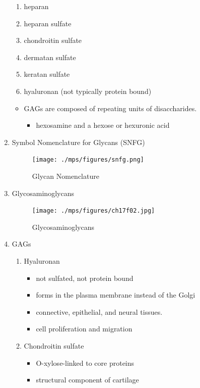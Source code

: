 \documentclass{scrartcl}
\begin{document}
\begin{enumerate}
\begin{enumerate}
\item heparan
\item heparan sulfate
\item chondroitin sulfate
\item dermatan sulfate
\item keratan sulfate
\item hyaluronan (not typically protein bound)
\end{enumerate}


\begin{itemize}
\item GAGs are composed of repeating units of disaccharides.
\begin{itemize}
\item hexosamine and a hexose or hexuronic acid
\end{itemize}
\end{itemize}

\item Symbol Nomenclature for Glycans (SNFG)
\label{sec:org1bddb03}

\begin{figure}[htbp]
\centering
\texttt{[image: ./mps/figures/snfg.png]}
\caption[Glycan Nomenclature]{\label{fig:orgaf4612b}
Glycan Nomenclature}
\end{figure}


\item Glycosaminoglycans
\label{sec:org3103504}

\begin{figure}[htbp]
\centering
\texttt{[image: ./mps/figures/ch17f02.jpg]}
\caption[Glycosaminoglycans]{\label{fig:org5339919}
Glycosaminoglycans}
\end{figure}

\item GAGs
\label{sec:orgef0bbdd}

\begin{enumerate}
\item Hyaluronan
\label{sec:org7885458}
\begin{itemize}
\item not sulfated, not protein bound
\item forms in the plasma membrane instead of the Golgi
\item connective, epithelial, and neural tissues.
\item cell proliferation and migration
\end{itemize}

\item Chondroitin sulfate
\label{sec:org4ab87f7}
\begin{itemize}
\item O-xylose-linked to core proteins
\item structural component of cartilage
\end{itemize}


\end{enumerate}
\end{enumerate}
\end{document}
